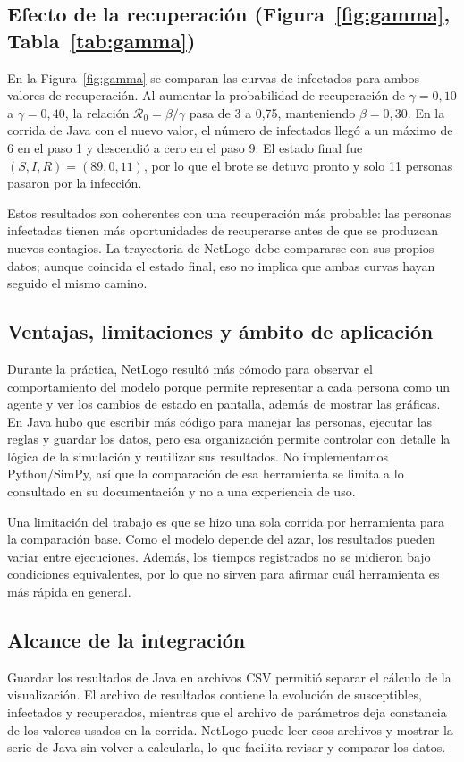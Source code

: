 \documentclass[11pt,a4paper]{article}
\begin{document}
\subsection{Efecto de la recuperación (Figura~\ref{fig:gamma}, Tabla~\ref{tab:gamma})}
En la Figura~\ref{fig:gamma} se comparan las curvas de infectados para ambos valores de recuperación. Al aumentar la probabilidad de recuperación de $\gamma=0{,}10$ a $\gamma=0{,}40$, la relación $\mathcal{R}_0=\beta/\gamma$ pasa de 3 a 0,75, manteniendo $\beta=0{,}30$. En la corrida de Java con el nuevo valor, el número de infectados llegó a un máximo de 6 en el paso 1 y descendió a cero en el paso 9. El estado final fue $(S,I,R)=(89,0,11)$, por lo que el brote se detuvo pronto y solo 11 personas pasaron por la infección.

Estos resultados son coherentes con una recuperación más probable: las personas infectadas tienen más oportunidades de recuperarse antes de que se produzcan nuevos contagios. La trayectoria de NetLogo debe compararse con sus propios datos; aunque coincida el estado final, eso no implica que ambas curvas hayan seguido el mismo camino.

\subsection{Ventajas, limitaciones y ámbito de aplicación}
Durante la práctica, NetLogo resultó más cómodo para observar el comportamiento del modelo porque permite representar a cada persona como un agente y ver los cambios de estado en pantalla, además de mostrar las gráficas. En Java hubo que escribir más código para manejar las personas, ejecutar las reglas y guardar los datos, pero esa organización permite controlar con detalle la lógica de la simulación y reutilizar sus resultados. No implementamos Python/SimPy, así que la comparación de esa herramienta se limita a lo consultado en su documentación y no a una experiencia de uso.

Una limitación del trabajo es que se hizo una sola corrida por herramienta para la comparación base. Como el modelo depende del azar, los resultados pueden variar entre ejecuciones. Además, los tiempos registrados no se midieron bajo condiciones equivalentes, por lo que no sirven para afirmar cuál herramienta es más rápida en general.

\subsection{Alcance de la integración}
Guardar los resultados de Java en archivos CSV permitió separar el cálculo de la visualización. El archivo de resultados contiene la evolución de susceptibles, infectados y recuperados, mientras que el archivo de parámetros deja constancia de los valores usados en la corrida. NetLogo puede leer esos archivos y mostrar la serie de Java sin volver a calcularla, lo que facilita revisar y comparar los datos.
\end{document}

